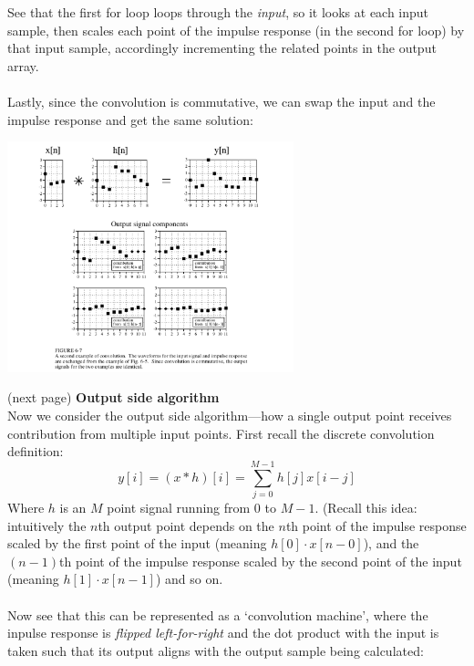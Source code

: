 \documentclass{report}
\begin{document}
See that the first for loop loops through the \textit{input}, so it looks at each input sample, then scales each 
point of the impulse response (in the second for loop) by that input sample, accordingly incrementing the related
points in the output array.\\
\vspace{1mm}\\
Lastly, since the convolution is commutative, we can swap the input and the impulse response and get
the same solution:
\begin{center}
\includegraphics[width=8.3cm]{a4}\\
\end{center}
(next page)\newpage
\noindent\textbf{Output side algorithm}\\
Now we consider the output side algorithm---how a single output point receives contribution from multiple
input points. First recall the discrete convolution definition:
\begin{equation*}
y[i]=(x*h)[i]=\sum^{M-1}_{j=0}h[j]x[i-j]
\end{equation*}
Where $h$ is an $M$ point signal running from 0 to $M-1$.
(Recall this idea: intuitively the $n$th output point depends on the $n$th point of the 
impulse response scaled by the first point of the input (meaning $h[0]\cdot x[n-0]$), and the $(n-1)$th point of the impulse response scaled by 
the second point of the input (meaning $h[1]\cdot x[n-1]$) and so on.\\
\vspace{1mm}\\
Now see that this can be represented as a `convolution machine', where the inpulse response is 
\textit{flipped left-for-right} and the dot product with the input is taken such that its output aligns 
with the output sample being calculated:
\end{document}
